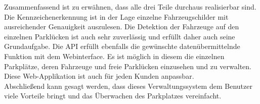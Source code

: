 Zusammenfassend ist zu erwähnen, dass alle drei Teile durchaus realisierbar sind. Die Kennzeichenerkennung ist in der Lage einzelne Fahrzeugschilder mit ausreichender Genauigkeit auszulesen. 
Die Detektion der Fahrzeuge auf den einzelnen Parklücken ist auch sehr zuverlässig und erfüllt daher auch seine Grundaufgabe. Die API erfüllt ebenfalls die gewünschte datenübermittelnde Funktion mit dem Webinterface.
Es ist möglich in diesem die einzelnen Parkplätze, deren Fahrzeuge und freie Parklücken einzusehen und zu verwalten. Diese Web-Applikation ist auch für jeden Kunden anpassbar.\\

Abschließend kann gesagt werden, dass dieses Verwaltungssystem dem Benutzer viele Vorteile bringt und das Überwachen des Parkplatzes vereinfacht.